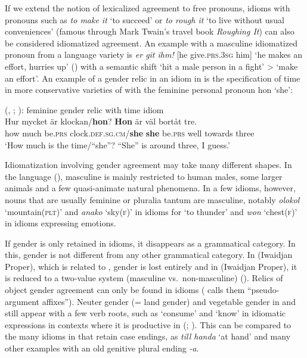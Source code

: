 \documentclass[output=collectionpaper]{langsci/langscibook}
\begin{document}
If we extend the notion of lexicalized agreement to free pronouns, idioms with pronouns such as  \textit{to make it} `to succeed' or \textit{to rough it} `to live without usual conveniences' (famous through Mark Twain's travel book \textit{Roughing It}) can also be considered idiomatized agreement. An example with a masculine idiomatized pronoun from a  language variety is  \textit{er git ihm!} [he give.\textsc{prs.3sg} him] `he makes an effort, hurries up' (\citealt[125]{Greyerz1997}) with a semantic shift `hit a male person in a fight' > `make an effort'. An example of a gender relic in an idiom in  is the specification of time in more conservative varieties of  with the feminine personal pronoun hon `she':

\ea\label{ex:WDG:74}
 (, ; \citealt[276]{Teleman1999}): feminine gender relic with time idiom\\
\gll Hur	mycket	är	klockan/\textbf{hon}?	\textendash{}	\textbf{Hon}	är	väl	bortåt	tre.\\
how	much	be.\textsc{prs}	clock.\textsc{def.sg.cm}/\textbf{she}	{} \textbf{she}	be.\textsc{prs}	well	towards	three\\
\glt `How much is the time/``she''? \textendash ``She'' is around three, I guess.'\\
\z

Idiomatization involving gender agreement may take many different shapes. In the  language  (), masculine is mainly restricted to human males, some larger animals and a few quasi-animate natural phenomena. In a few idioms, however, nouns that are usually feminine or pluralia tantum are masculine, notably \textit{olokol} `mountain(\textsc{plt})' and \textit{anako} `sky(\textsc{f})' in idioms for `to thunder' and \textit{won} `chest(\textsc{f})' in idioms expressing emotions.

If gender is only retained in idioms, it disappears as a grammatical category. In this, gender is not different from any other grammatical category. In  (Iwaidjan Proper), which is related to , gender is lost entirely and in  (Iwaidjan Proper), it is reduced to a two-value system (masculine vs.\ non-masculine) (\citealt[115]{Evans2000}). Relics of object gender agreement can only be found in idioms (\citealt{Evans2000} calls them ``pseudo-argument affixes''). Neuter gender (= land gender) and vegetable gender in  and  still appear with a few verb roots, such as `consume' and `know' in idiomatic expressions in contexts where it is productive in  (\citealt[116]{Evans2000}; \citealt[643]{Singer2011}). This can be compared to the many idioms in  that retain case endings, as \textit{till handa} `at hand' and many other examples with an old genitive plural ending \textit{-a}.
\end{document}
